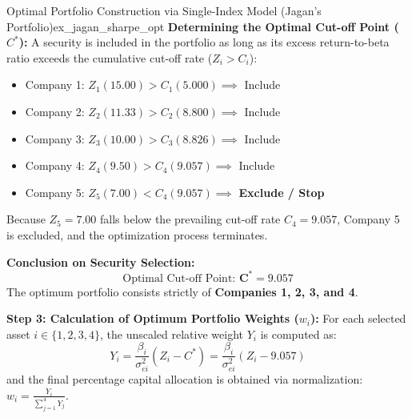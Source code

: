 \begin{example}{Optimal Portfolio Construction via Single-Index Model (Jagan's Portfolio)}{ex_jagan_sharpe_opt}
\textbf{Determining the Optimal Cut-off Point ($C^*$):}
A security is included in the portfolio as long as its excess return-to-beta ratio exceeds the cumulative cut-off rate ($Z_i > C_i$):
\begin{itemize}[leftmargin=*, noitemsep]
    \item Company 1: $Z_1 (15.00) > C_1 (5.000) \implies$ Include
    \item Company 2: $Z_2 (11.33) > C_2 (8.800) \implies$ Include
    \item Company 3: $Z_3 (10.00) > C_3 (8.826) \implies$ Include
    \item Company 4: $Z_4 (9.50) > C_4 (9.057) \implies$ Include
    \item Company 5: $Z_5 (7.00) < C_4 (9.057) \implies$ \textbf{Exclude / Stop}
\end{itemize}
Because $Z_5 = 7.00$ falls below the prevailing cut-off rate $C_4 = 9.057$, Company 5 is excluded, and the optimization process terminates.

\textbf{Conclusion on Security Selection:}
\begin{equation*}
    \text{Optimal Cut-off Point: } \mathbf{C^* = 9.057}
\end{equation*}
The optimum portfolio consists strictly of \textbf{Companies 1, 2, 3, and 4}.

\tcbline
\textbf{Step 3: Calculation of Optimum Portfolio Weights ($w_i$):}
For each selected asset $i \in \{1, 2, 3, 4\}$, the unscaled relative weight $Y_i$ is computed as:
\begin{equation*}
    Y_i = \frac{\beta_i}{\sigma_{ei}^2} (Z_i - C^*) = \frac{\beta_i}{\sigma_{ei}^2} (Z_i - 9.057)
\end{equation*}
and the final percentage capital allocation is obtained via normalization: $w_i = \frac{Y_i}{\sum_{j=1}^4 Y_j}$.


\end{example}

